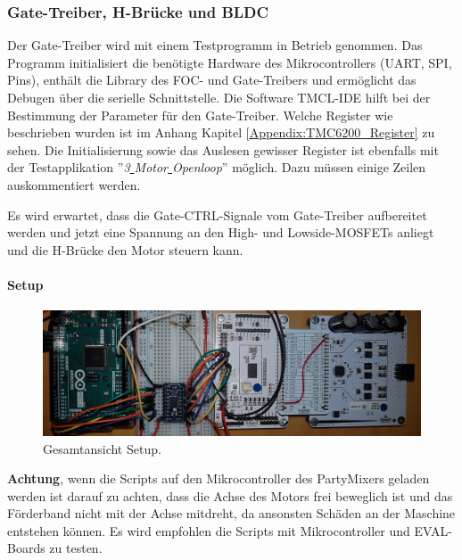 \subsubsection{Gate-Treiber, H-Brücke und BLDC}
\label{subsubsec:Inbetriebnahme_Gate_Treiber}

Der Gate-Treiber wird mit einem Testprogramm in Betrieb genommen. Das Programm initialisiert die benötigte Hardware des Mikrocontrollers (UART, SPI, Pins), enthält die Library des FOC- und Gate-Treibers und ermöglicht das Debugen über die serielle Schnittstelle. Die Software TMCL-IDE hilft bei der Bestimmung der Parameter für den Gate-Treiber. Welche Register wie beschrieben wurden ist im Anhang Kapitel \ref{Appendix:TMC6200_Register} zu sehen. Die Initialisierung sowie das Auslesen gewisser Register ist ebenfalls mit der Testapplikation ''\textit{3\underline{ }Motor\underline{ }Openloop}'' möglich. Dazu müssen einige Zeilen auskommentiert werden.

Es wird erwartet, dass die Gate-CTRL-Signale vom Gate-Treiber aufbereitet werden und jetzt eine Spannung an den High- und Lowside-MOSFETs anliegt und die H-Brücke den Motor steuern kann.
\newpage
\paragraph{Setup}\mbox{}

\begin{figure}[H]
	\centering
	\includegraphics[angle=270,width=\textwidth]{graphics/2_komplett1}
	\caption{Gesamtansicht Setup.}
	\label{fig:2_komplett1}
\end{figure}

\textbf{Achtung}, wenn die Scripts auf den Mikrocontroller des PartyMixers geladen werden ist darauf zu achten, dass die Achse des Motors frei beweglich ist und das Förderband nicht mit der Achse mitdreht, da ansonsten Schäden an der Maschine entstehen können. Es wird empfohlen die Scripts mit Mikrocontroller und EVAL-Boards zu testen.

